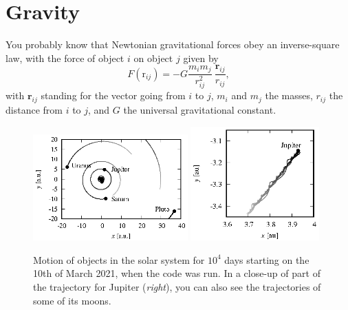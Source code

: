 
\section{Gravity}

You probably know that Newtonian gravitational forces obey an inverse-square
law, with the force of object $i$ on object $j$ given by
\begin{equation*}
  F(\mathrm{r}_{ij}) = -G \frac{m_i m_j}{r_{ij}^2}\ 
                          \frac{\mathbf{r}_{ij}}{r_{ij}},
\end{equation*}
with $\mathbf{r}_{ij}$ standing for the vector going from $i$ to $j$, $m_i$ and 
$m_j$ the masses, $r_{ij}$ the distance from $i$ to $j$, and $G$ the universal
gravitational constant.

\begin{figure}
  \begin{center}
  \includegraphics[width = 0.53\textwidth]{figures/gravity.eps}
  \includegraphics[width = 0.44\textwidth]{figures/Jupiter.eps}
  \end{center}
  \caption{\label{gravity}Motion of objects in the solar system for $10^4$ days 
           starting on the 10th of March 2021, when the code was run. In a 
           close-up of part of the trajectory for Jupiter (\textit{right}), you 
           can also see the trajectories of some of its moons.}
\end{figure}


